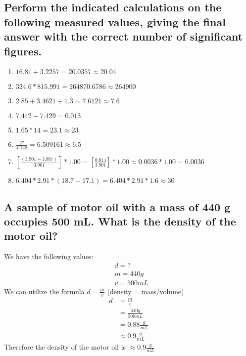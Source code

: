 \documentclass[11pt]{article}
\begin{document}
\subsection{Perform the indicated calculations on the following measured values, giving the final answer with the correct number of significant figures.}
\label{sec:orgcff167b}
\begin{enumerate}
\item \(16.81 + 3.2257 = 20.0357 \approx 20.04\)
\item \(324.6 * 815.991 = 264870.6786 \approx 264900\)
\item \(2.85 + 3.4621 + 1.3 = 7.6121 \approx 7.6\)
\item \(7.442 - 7.429 = 0.013\)
\item \(1.65 * 14 = 23.1 \approx 23\)
\item \(\frac{27}{4.148} = 6.509161 \approx 6.5\)
\item \([\frac{(3.901 - 3.887)}{3.901}] * 1.00 = [\frac{0.014}{3.901}] * 1.00 \approx 0.0036 * 1.00 = 0.0036\)
\item \(6.404 * 2.91 * (18.7 - 17.1) = 6.404 * 2.91 * 1.6 \approx 30\)
\end{enumerate}

\subsection{A sample of motor oil with a mass of 440 g occupies 500 mL. What is the density of the motor oil?}
\label{sec:orgd660ba5}
We have the following values:
\begin{align*}
&d = ?\\
&m = 440g\\
&v = 500mL
\end{align*}
We can utilize the formula \(d=\frac{m}{v}\) (density = mass/volume)
\begin{align*}
d&=\frac{m}{v}\\
&=\frac{440g}{500mL}\\
&=0.88\frac{g}{mL}\\
&\approx0.9\frac{g}{mL}
\end{align*}
Therefore the density of the motor oil is \(\approx0.9\frac{g}{mL}\)
\end{document}
